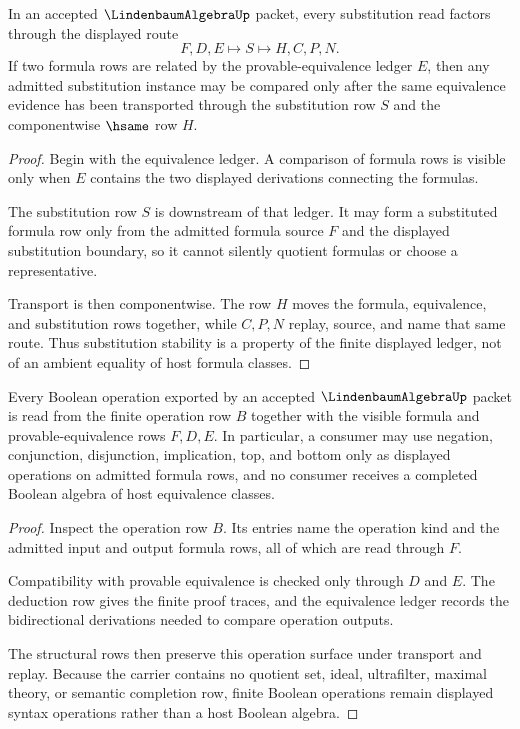 \begin{theorem}
\label{thm:lindenbaum-algebra-substitution-stability}
In an accepted $\LindenbaumAlgebraUp$ packet, every substitution read factors through the displayed route
$$
F,D,E \longmapsto S \longmapsto H,C,P,N .
$$
If two formula rows are related by the provable-equivalence ledger $E$, then any admitted substitution instance may be compared only after the same equivalence evidence has been transported through the substitution row $S$ and the componentwise $\hsame$ row $H$.
\end{theorem}
\begin{proof}
Begin with the equivalence ledger. A comparison of formula rows is visible only when $E$ contains the two displayed derivations connecting the formulas.

The substitution row $S$ is downstream of that ledger. It may form a substituted formula row only from the admitted formula source $F$ and the displayed substitution boundary, so it cannot silently quotient formulas or choose a representative.

Transport is then componentwise. The row $H$ moves the formula, equivalence, and substitution rows together, while $C,P,N$ replay, source, and name that same route. Thus substitution stability is a property of the finite displayed ledger, not of an ambient equality of host formula classes.
\end{proof}

\begin{theorem}
\label{thm:lindenbaum-algebra-finite-boolean-operations}
Every Boolean operation exported by an accepted $\LindenbaumAlgebraUp$ packet is read from the finite operation row $B$ together with the visible formula and provable-equivalence rows $F,D,E$. In particular, a consumer may use negation, conjunction, disjunction, implication, top, and bottom only as displayed operations on admitted formula rows, and no consumer receives a completed Boolean algebra of host equivalence classes.
\end{theorem}
\begin{proof}
Inspect the operation row $B$. Its entries name the operation kind and the admitted input and output formula rows, all of which are read through $F$.

Compatibility with provable equivalence is checked only through $D$ and $E$. The deduction row gives the finite proof traces, and the equivalence ledger records the bidirectional derivations needed to compare operation outputs.

The structural rows then preserve this operation surface under transport and replay. Because the carrier contains no quotient set, ideal, ultrafilter, maximal theory, or semantic completion row, finite Boolean operations remain displayed syntax operations rather than a host Boolean algebra.
\end{proof}

